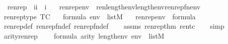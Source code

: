 \begin{isabellebody}
\isanewline
\ \ renrep\ {\isacharcolon}{\kern0pt}{\isacharcolon}{\kern0pt}\ {\isachardoublequoteopen}{\isacharbrackleft}{\kern0pt}i{\isacharcomma}{\kern0pt}i{\isacharbrackright}{\kern0pt}\ {\isasymRightarrow}\ i{\isachardoublequoteclose}\ \isanewline
\ \ {\isachardoublequoteopen}renrep{\isacharparenleft}{\kern0pt}{\isasymphi}{\isacharcomma}{\kern0pt}env{\isacharparenright}{\kern0pt}\ {\isacharequal}{\kern0pt}\ ren{\isacharparenleft}{\kern0pt}{\isasymphi}{\isacharparenright}{\kern0pt}{\isacharbackquote}{\kern0pt}{\isacharparenleft}{\kern0pt}{}{\isacharhash}{\kern0pt}{\isacharplus}{\kern0pt}length{\isacharparenleft}{\kern0pt}env{\isacharparenright}{\kern0pt}{\isacharparenright}{\kern0pt}{\isacharbackquote}{\kern0pt}{\isacharparenleft}{\kern0pt}{}{\isacharhash}{\kern0pt}{\isacharplus}{\kern0pt}length{\isacharparenleft}{\kern0pt}env{\isacharparenright}{\kern0pt}{\isacharparenright}{\kern0pt}{\isacharbackquote}{\kern0pt}renrep{\isacharunderscore}{\kern0pt}fn{\isacharparenleft}{\kern0pt}env{\isacharparenright}{\kern0pt}{\isachardoublequoteclose}\isanewline
\isanewline
{}\isamarkupfalse%
\ renrep{\isacharunderscore}{\kern0pt}type\ {\isacharbrackleft}{\kern0pt}TC{\isacharbrackright}{\kern0pt}{\isacharcolon}{\kern0pt}\isanewline
\ \ \ {\isachardoublequoteopen}{\isasymphi}{\isasymin}formula{\isachardoublequoteclose}\ {\isachardoublequoteopen}env\ {\isasymin}\ list{\isacharparenleft}{\kern0pt}M{\isacharparenright}{\kern0pt}{\isachardoublequoteclose}\isanewline
\ \ \ {\isachardoublequoteopen}renrep{\isacharparenleft}{\kern0pt}{\isasymphi}{\isacharcomma}{\kern0pt}env{\isacharparenright}{\kern0pt}\ {\isasymin}\ formula{\isachardoublequoteclose}\isanewline
%
\isadelimproof
\ \ %
\endisadelimproof
%
\isatagproof
{}\isamarkupfalse%
\ renrep{\isacharunderscore}{\kern0pt}def\ renrep{\isacharunderscore}{\kern0pt}fn{\isacharunderscore}{\kern0pt}def\ renrep{}{\isacharunderscore}{\kern0pt}fn{\isacharunderscore}{\kern0pt}def\isanewline
\ \ \isamarkupfalse%
\ assms\ renrep{}{\isacharunderscore}{\kern0pt}thm{\isacharparenleft}{\kern0pt}{}{\isacharparenright}{\kern0pt}\ ren{\isacharunderscore}{\kern0pt}tc\isanewline
\ \ \isamarkupfalse%
\ simp%
\endisatagproof
{\isafoldproof}%
%
\isadelimproof
\isanewline
%
\endisadelimproof
\isanewline
{}\isamarkupfalse%
\ arity{\isacharunderscore}{\kern0pt}renrep{\isacharcolon}{\kern0pt}\isanewline
\ \ \ \ {\isachardoublequoteopen}{\isasymphi}{\isasymin}formula{\isachardoublequoteclose}\ {\isachardoublequoteopen}arity{\isacharparenleft}{\kern0pt}{\isasymphi}{\isacharparenright}{\kern0pt}{\isasymle}\ {}{\isacharhash}{\kern0pt}{\isacharplus}{\kern0pt}length{\isacharparenleft}{\kern0pt}env{\isacharparenright}{\kern0pt}{\isachardoublequoteclose}\ {\isachardoublequoteopen}env\ {\isasymin}\ list{\isacharparenleft}{\kern0pt}M{\isacharparenright}{\kern0pt}{\isachardoublequoteclose}\isanewline

\end{isabellebody}
